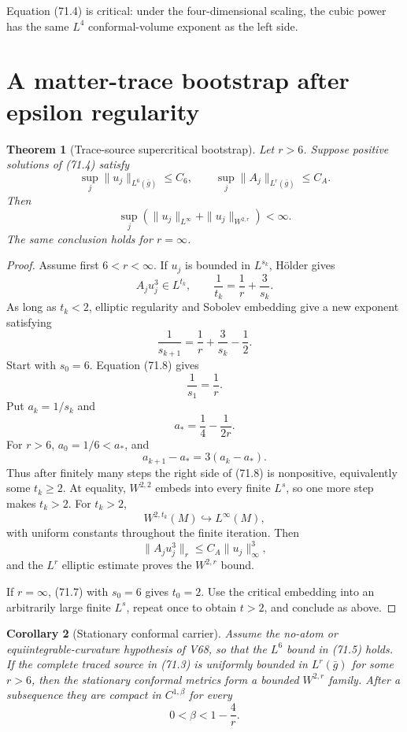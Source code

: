 \documentclass[11pt]{article}
\newtheorem{theorem}{Theorem}[section]
\newtheorem{corollary}[theorem]{Corollary}
\theoremstyle{remark}
\begin{document}
Equation (71.4) is critical: under the four-dimensional scaling,
the cubic power has the same \(L^4\) conformal-volume exponent as
the left side.

\section{A matter-trace bootstrap after epsilon regularity}

\begin{theorem}[Trace-source supercritical bootstrap]
\label{thm:v15v71-trace-bootstrap}
Let \(r>6\).  Suppose positive solutions of (71.4) satisfy
\[
 \sup_j\|u_j\|_{L^6(\bar g)}\leq C_6,\qquad
 \sup_j\|A_j\|_{L^r(\bar g)}\leq C_A.                 \tag{71.5}
\]
Then
\[
 \sup_j\left(
 \|u_j\|_{L^\infty}
 +\|u_j\|_{W^{2,r}}
 \right)<\infty.                                      \tag{71.6}
\]
The same conclusion holds for \(r=\infty\).
\end{theorem}

\begin{proof}
Assume first \(6<r<\infty\).  If \(u_j\) is bounded in
\(L^{s_k}\), H\"older gives
\[
 A_ju_j^3\in L^{t_k},\qquad
 \frac1{t_k}=\frac1r+\frac3{s_k}.                     \tag{71.7}
\]
As long as \(t_k<2\), elliptic regularity and Sobolev embedding
give a new exponent satisfying
\[
 \frac1{s_{k+1}}
 =
 \frac1r+\frac3{s_k}-\frac12.                         \tag{71.8}
\]
Start with \(s_0=6\).  Equation (71.8) gives
\[
 \frac1{s_1}=\frac1r.
\]
Put \(a_k=1/s_k\) and
\[
 a_*=\frac14-\frac1{2r}.
\]
For \(r>6\), \(a_0=1/6<a_*\), and
\[
 a_{k+1}-a_*=3(a_k-a_*).                              \tag{71.9}
\]
Thus after finitely many steps the right side of (71.8) is
nonpositive, equivalently some \(t_k\geq2\).  At equality,
\(W^{2,2}\) embeds into every finite \(L^s\), so one more step makes
\(t_k>2\).  For \(t_k>2\),
\[
 W^{2,t_k}(M)\hookrightarrow L^\infty(M),
\]
with uniform constants throughout the finite iteration.  Then
\[
 \|A_ju_j^3\|_r
 \leq C_A\|u_j\|_\infty^3,
\]
and the \(L^r\) elliptic estimate proves the \(W^{2,r}\) bound.

If \(r=\infty\), (71.7) with \(s_0=6\) gives \(t_0=2\).
Use the critical embedding into an arbitrarily large finite
\(L^s\), repeat once to obtain \(t>2\), and conclude as above.
\end{proof}

\begin{corollary}[Stationary conformal carrier]
\label{cor:v15v71-stationary-carrier}
Assume the no-atom or equiintegrable-curvature hypothesis of V68,
so that the \(L^6\) bound in (71.5) holds.  If the complete traced
source in (71.3) is uniformly bounded in
\(L^r(\bar g)\) for some \(r>6\), then the stationary conformal
metrics form a bounded \(W^{2,r}\) family.  After a subsequence they
are compact in \(C^{1,\beta}\) for every
\[
 0<\beta<1-\frac4r.                                   \tag{71.10}
\]
\end{corollary}
\end{document}
